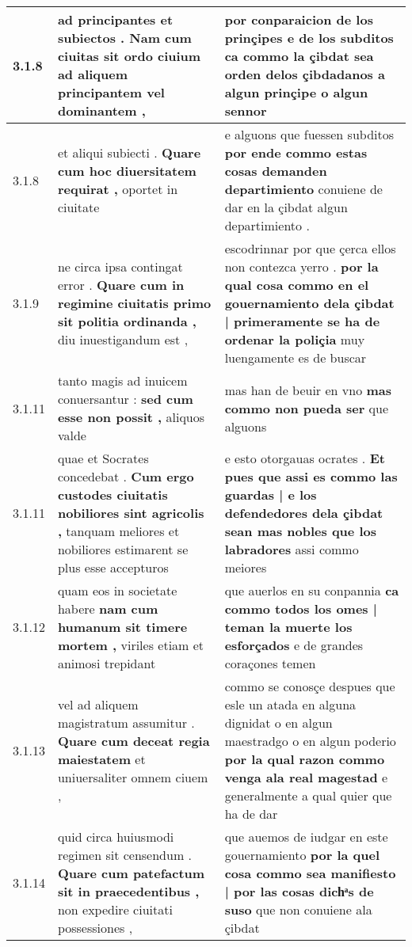 \begin{tabular}{|p{1cm}|p{6.5cm}|p{6.5cm}|}
3.1.8 & ad principantes et subiectos . \textbf{ Nam cum ciuitas sit ordo ciuium } ad aliquem principantem vel dominantem , & por conparaicion de los prinçipes e de los subditos \textbf{ ca commo la çibdat sea orden } delos çibdadanos a algun prinçipe o algun sennor \\\hline
3.1.8 & et aliqui subiecti . \textbf{ Quare cum hoc diuersitatem requirat , } oportet in ciuitate & e alguons que fuessen subditos \textbf{ por ende commo estas cosas demanden departimiento } conuiene de dar en la çibdat algun departimiento . \\\hline
3.1.9 & ne circa ipsa contingat error . \textbf{ Quare cum in regimine ciuitatis primo sit politia ordinanda , } diu inuestigandum est , & escodrinnar por que çerca ellos non contezca yerro . \textbf{ por la qual cosa commo en el gouernamiento dela çibdat | primeramente se ha de ordenar la poliçia } muy luengamente es de buscar \\\hline
3.1.11 & tanto magis ad inuicem conuersantur : \textbf{ sed cum esse non possit , } aliquos valde & mas han de beuir en vno \textbf{ mas commo non pueda ser } que alguons \\\hline
3.1.11 & quae et Socrates concedebat . \textbf{ Cum ergo custodes ciuitatis nobiliores sint agricolis , } tanquam meliores et nobiliores estimarent se plus esse accepturos & e esto otorgauas ocrates . \textbf{ Et pues que assi es commo las guardas | e los defendedores dela çibdat sean mas nobles que los labradores } assi commo meiores \\\hline
3.1.12 & quam eos in societate habere \textbf{ nam cum humanum sit timere mortem , } viriles etiam et animosi trepidant & que auerlos en su conpannia \textbf{ ca commo todos los omes | teman la muerte los esforçados } e de grandes coraçones temen \\\hline
3.1.13 & vel ad aliquem magistratum assumitur . \textbf{ Quare cum deceat regia maiestatem } et uniuersaliter omnem ciuem , & commo se conosçe despues que esle un atada en alguna dignidat o en algun maestradgo o en algun poderio \textbf{ por la qual razon commo venga ala real magestad } e generalmente a qual quier que ha de dar \\\hline
3.1.14 & quid circa huiusmodi regimen sit censendum . \textbf{ Quare cum patefactum sit in praecedentibus , } non expedire ciuitati possessiones , & que auemos de iudgar en este gouernamiento \textbf{ por la quel cosa commo sea manifiesto | por las cosas dichͣs de suso } que non conuiene ala çibdat \\\hline

\end{tabular}

